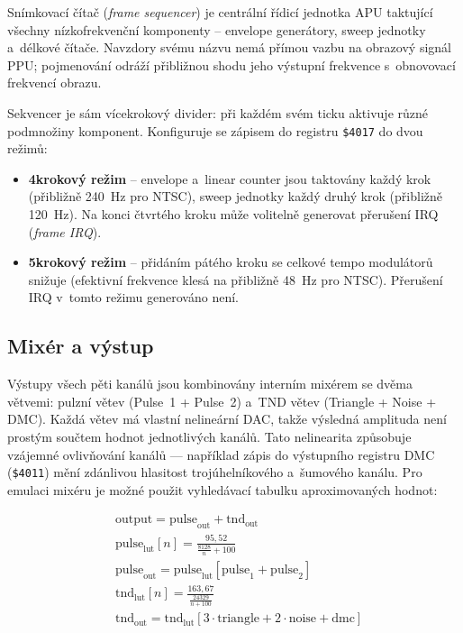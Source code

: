 Snímkovací čítač (\textit{frame sequencer}) je centrální řídicí jednotka APU taktující všechny
nízkofrekvenční komponenty -- envelope generátory, sweep jednotky a~délkové čítače. Navzdory svému
názvu nemá přímou vazbu na obrazový signál PPU; pojmenování odráží přibližnou shodu jeho výstupní
frekvence s~obnovovací frekvencí obrazu.

Sekvencer je sám vícekrokový divider: při každém svém ticku aktivuje různé podmnožiny komponent.
Konfiguruje se zápisem do registru \texttt{\$4017} do dvou režimů:

\begin{itemize}
    \item \textbf{4krokový režim} -- envelope a~linear counter jsou taktovány každý krok (přibližně
        240~Hz pro NTSC), sweep jednotky každý druhý krok (přibližně 120~Hz). Na konci čtvrtého
        kroku může volitelně generovat přerušení IRQ (\textit{frame IRQ}).
    \item \textbf{5krokový režim} -- přidáním pátého kroku se celkové tempo modulátorů snižuje
        (efektivní frekvence klesá na přibližně 48~Hz pro NTSC). Přerušení IRQ v~tomto režimu
        generováno není.
\end{itemize}

\subsection{Mixér a výstup}

Výstupy všech pěti kanálů jsou kombinovány interním mixérem se dvěma větvemi: pulzní větev (Pulse~1
+ Pulse~2) a~TND větev (Triangle + Noise + DMC). Každá větev má vlastní nelineární DAC, takže
výsledná amplituda není prostým součtem hodnot jednotlivých kanálů. Tato nelinearita způsobuje
vzájemné ovlivňování kanálů — například zápis do výstupního registru DMC (\texttt{\$4011}) mění
zdánlivou hlasitost trojúhelníkového a~šumového kanálu. Pro emulaci mixéru je možné použit
vyhledávací tabulku aproximovaných hodnot\cite{nesdev-apu-lut}:

\vspace{-0.75cm}

\begin{align*}
    &\text{output} = \text{pulse}_{\text{out}} + \text{tnd}_{\text{out}}\\
    &\text{pulse}_\text{lut}[n] = \frac{95,52}{\frac{8128}{n} + 100}\\
    &\text{pulse}_\text{out} = \text{pulse}_\text{lut}[\text{pulse}_1 + \text{pulse}_2]\\
    &\text{tnd}_\text{lut}[n] = \frac{163,67}{\frac{24329}{n + 100}}\\
    &\text{tnd}_\text{out} = \text{tnd}_\text{lut}[3 \cdot \text{triangle} + 2 \cdot \text{noise} +
    \text{dmc}]
\end{align*}

